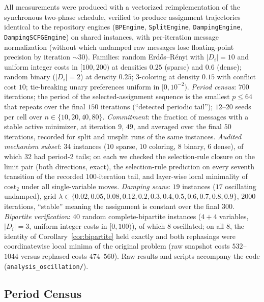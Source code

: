 All measurements were produced with a vectorized reimplementation of the
synchronous two-phase schedule, verified to produce assignment
trajectories identical to the repository engines
(\texttt{BPEngine}, \texttt{SplitEngine}, \texttt{DampingEngine},
\texttt{DampingSCFGEngine}) on shared instances, with per-iteration
message normalization (without which undamped raw messages lose
floating-point precision by iteration ${\sim}30$).  Families: random
Erd\H{o}s--R\'enyi with $|D_i| = 10$ and uniform integer costs in
$[100, 200)$ at densities $0.25$ (sparse) and $0.6$ (dense); random
binary ($|D_i| = 2$) at density $0.25$; 3-coloring at density $0.15$
with conflict cost $10$; tie-breaking unary preferences uniform in
$[0, 10^{-2})$.  \emph{Period census}: $700$ iterations; the period of
the selected-assignment sequence is the smallest $p \le 64$ that repeats
over the final $150$ iterations (``detected periodic tail''); $12$--$20$
seeds per cell over $n \in \{10, 20, 40, 80\}$.  \emph{Commitment}: the
fraction of messages with a stable active minimizer, at iteration $9$,
$49$, and averaged over the final $50$ iterations, recorded for split
and unsplit runs of the same instances.  \emph{Audited mechanism
subset}: $34$ instances ($10$ sparse, $10$ coloring, $8$ binary, $6$
dense), of which $32$ had period-2 tails; on each we checked the
selection-rule closure on the limit pair (both directions, exact), the
selection-rule prediction on every seventh transition of the recorded
$100$-iteration tail, and layer-wise local minimality of
$\mathrm{cost}_2$ under all single-variable moves.  \emph{Damping scans}:
$19$ instances ($17$ oscillating undamped), grid
$\lambda \in \{0.02, 0.05, 0.08, 0.12, 0.2, 0.3, 0.4, 0.5, 0.6, 0.7,
0.8, 0.9\}$, $2000$ iterations, ``stable'' meaning the assignment is
constant over the final $300$.  \emph{Bipartite verification}: $40$
random complete-bipartite instances ($4{+}4$ variables, $|D_i| = 3$,
uniform integer costs in $[0,100)$), of which $8$ oscillated; on all
$8$, the identity of Corollary~\ref{cor:bipartite} held exactly and both
rephasings were coordinatewise local minima of the original problem
(raw snapshot costs $532$--$1044$ versus rephased costs $474$--$560$).
Raw results and scripts accompany the code
(\texttt{analysis\_oscillation/}).

\subsection{Period Census}

